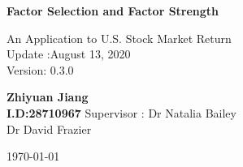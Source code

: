 \begin{titlepage}
\begin{center}
\vspace*{1cm}
\Huge
\textbf{Factor Selection and Factor Strength}

\vspace{0.5cm}
\LARGE
An Application to U.S. Stock Market Return\\
\Large
Update :August 13, 2020 \\
Version: 0.3.0

\vspace{1.5 cm}
\textbf{Zhiyuan Jiang\\I.D:28710967}
\vfill
 Supervisor : Dr Natalia Bailey\\\hspace{30mm} Dr David Frazier
 \vspace{0.8cm}
 
\Large
\today
\end{center}
\end{titlepage}